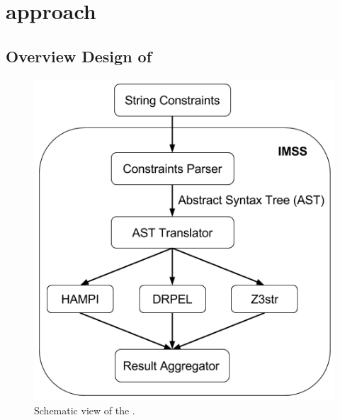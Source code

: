 \section{approach}
\label{sec:approach}

\subsection{Overview Design of \imss}

\begin{figure}
    \centering
    \includegraphics[scale=0.45]{imss}
    \caption{\label{fig:imss}Schematic view of the \imss.}
\end{figure}


